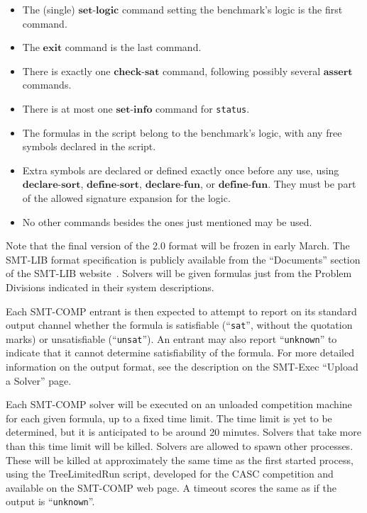 \documentclass[12pt]{article}
\newcommand{\akey}[1]{\textbf{#1}}
\begin{document}
\begin{itemize}
\item The (single) $\akey{set-logic}$ command setting the benchmark's
logic is the first command.
\item The $\akey{exit}$ command is the last command.
\item There is exactly one $\akey{check-sat}$ command,
following possibly several $\akey{assert}$ commands.
\item There is at most one $\akey{set-info}$ command for \texttt{status}.
\item The formulas in the script belong to the benchmark's logic, with
any free symbols declared in the script.
\item Extra symbols are declared or defined exactly once before any
  use, using $\akey{declare-sort}$, $\akey{define-sort}$,
  $\akey{declare-fun}$, or $\akey{define-fun}$.  They must be part of
  the allowed signature expansion for the logic.
\item No other commands besides the ones just mentioned may be used.
\end{itemize}

\noindent Note that the final version of the 2.0 format will be frozen
in early March.  The SMT-LIB format specification is publicly
available from the ``Documents'' section of the SMT-LIB
website~\cite{SMT-LIB}.  Solvers will be given formulas just from the
Problem Divisions indicated in their system descriptions.  

Each SMT-COMP entrant is then expected to attempt to report on its
standard output channel whether the formula is satisfiable
(``\texttt{sat}'', without the quotation marks) or unsatisfiable
(``\texttt{unsat}'').  An entrant may also report ``\texttt{unknown}''
to indicate that it cannot determine satisfiability of the formula.
For more detailed information on the output format, see the
description on the SMT-Exec ``Upload a Solver'' page.

Each SMT-COMP solver will be executed on an
unloaded competition machine for each given formula, up to a fixed
time limit.  The time limit is yet to be determined, but it is
anticipated to be around 20 minutes.  Solvers that take more than this
time limit will be killed.  Solvers are allowed to spawn other
processes.  These will be killed at approximately the same time as the
first started process, using the TreeLimitedRun script, developed for
the CASC competition and available on the SMT-COMP web page.  A
timeout scores the same as if the output is ``\texttt{unknown}''.
\end{document}
